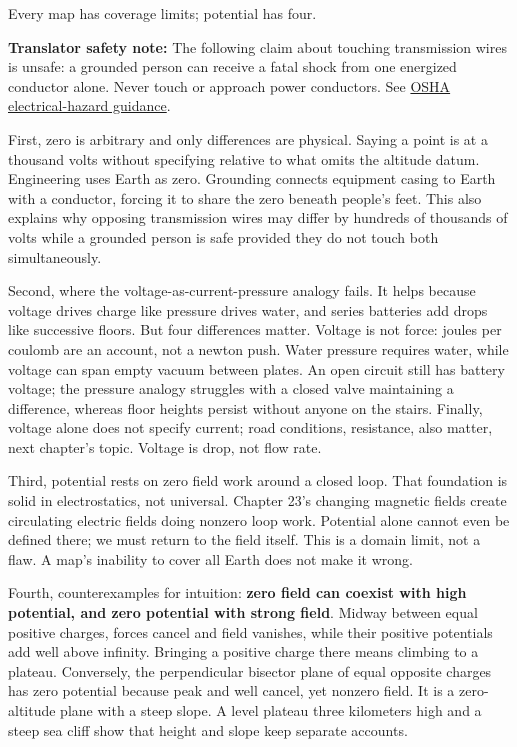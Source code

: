 
\begin{mainline}
Every map has coverage limits; potential has four.

\textbf{Translator safety note:} The following claim about touching transmission wires is unsafe: a grounded person can receive a fatal shock from one energized conductor alone. Never touch or approach power conductors. See \href{https://www.osha.gov/etools/poultry-processing/plant-wide-hazards/electrical-hazards}{OSHA electrical-hazard guidance}.

First, zero is arbitrary and only differences are physical. Saying a point is at a thousand volts without specifying relative to what omits the altitude datum. Engineering uses Earth as zero. Grounding connects equipment casing to Earth with a conductor, forcing it to share the zero beneath people's feet. This also explains why opposing transmission wires may differ by hundreds of thousands of volts while a grounded person is safe provided they do not touch both simultaneously.

Second, where the voltage-as-current-pressure analogy fails. It helps because voltage drives charge like pressure drives water, and series batteries add drops like successive floors. But four differences matter. Voltage is not force: joules per coulomb are an account, not a newton push. Water pressure requires water, while voltage can span empty vacuum between plates. An open circuit still has battery voltage; the pressure analogy struggles with a closed valve maintaining a difference, whereas floor heights persist without anyone on the stairs. Finally, voltage alone does not specify current; road conditions, resistance, also matter, next chapter's topic. Voltage is drop, not flow rate.

Third, potential rests on zero field work around a closed loop. That foundation is solid in electrostatics, not universal. Chapter 23's changing magnetic fields create circulating electric fields doing nonzero loop work. Potential alone cannot even be defined there; we must return to the field itself. This is a domain limit, not a flaw. A map's inability to cover all Earth does not make it wrong.

Fourth, counterexamples for intuition: \textbf{zero field can coexist with high potential, and zero potential with strong field}. Midway between equal positive charges, forces cancel and field vanishes, while their positive potentials add well above infinity. Bringing a positive charge there means climbing to a plateau. Conversely, the perpendicular bisector plane of equal opposite charges has zero potential because peak and well cancel, yet nonzero field. It is a zero-altitude plane with a steep slope. A level plateau three kilometers high and a steep sea cliff show that height and slope keep separate accounts.
\end{mainline}

